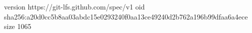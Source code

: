version https://git-lfs.github.com/spec/v1
oid sha256:a20d0cc5b8aa03abdc15e0293240f0aa13ce49240d2b762a196b99dfaa6a4ece
size 1065
